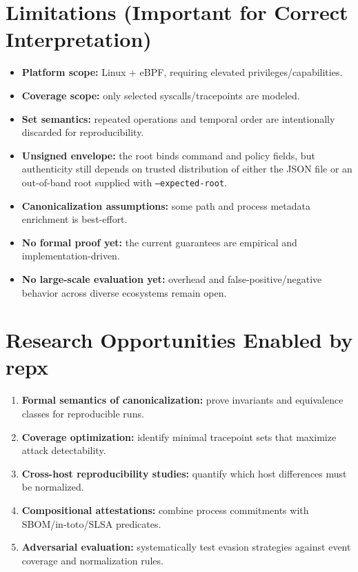 \documentclass[11pt]{article}
\begin{document}
\section{Limitations (Important for Correct Interpretation)}
\begin{itemize}
  \item \textbf{Platform scope:} Linux + eBPF, requiring elevated privileges/capabilities.
  \item \textbf{Coverage scope:} only selected syscalls/tracepoints are modeled.
  \item \textbf{Set semantics:} repeated operations and temporal order are intentionally discarded for reproducibility.
  \item \textbf{Unsigned envelope:} the root binds command and policy fields, but authenticity still depends on trusted distribution of either the JSON file or an out-of-band root supplied with \texttt{--expected-root}.
  \item \textbf{Canonicalization assumptions:} some path and process metadata enrichment is best-effort.
  \item \textbf{No formal proof yet:} the current guarantees are empirical and implementation-driven.
  \item \textbf{No large-scale evaluation yet:} overhead and false-positive/negative behavior across diverse ecosystems remain open.
\end{itemize}

\section{Research Opportunities Enabled by repx}
\begin{enumerate}
  \item \textbf{Formal semantics of canonicalization:} prove invariants and equivalence classes for reproducible runs.
  \item \textbf{Coverage optimization:} identify minimal tracepoint sets that maximize attack detectability.
  \item \textbf{Cross-host reproducibility studies:} quantify which host differences must be normalized.
  \item \textbf{Compositional attestations:} combine process commitments with SBOM/in-toto/SLSA predicates.
  \item \textbf{Adversarial evaluation:} systematically test evasion strategies against event coverage and normalization rules.
\end{enumerate}
\end{document}
